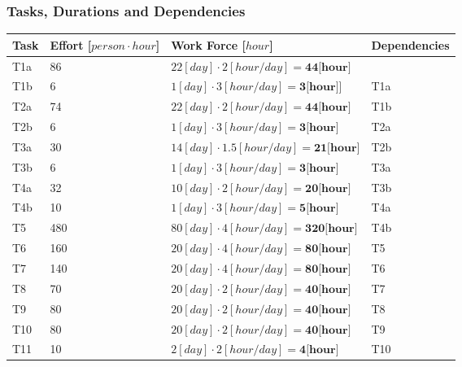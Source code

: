 \subsubsection{Tasks, Durations and Dependencies}
\lipsum[100]
\begin{center}
	\begin{tabulary}{\linewidth\tymin=70pt}{Y{1cm}|Y{2.5cm}|Y{4cm}|Y{2.5cm}}
		\textbf{Task} & \textbf{Effort [$person \cdot hour$]} & \textbf{Work Force [$hour$]} & \textbf{Dependencies} \\ \hline
		T1a &  86 & $22[day] \cdot 2[hour/day] = \textbf{44[hour]}$  & \\ \hline
		T1b & 6 & $1[day] \cdot 3[hour/day] = \textbf{3[hour]}$] & T1a \\ \hline
		T2a & 74 & $22[day] \cdot 2[hour/day] = \textbf{44[hour]}$ & T1b \\ \hline
		T2b & 6 & $1[day] \cdot 3[hour/day] = \textbf{3[hour]}$ & T2a \\ \hline
		T3a & 30 & $14[day] \cdot 1.5[hour/day] = \textbf{21[hour]}$ & T2b \\ \hline
		T3b & 6 & $1[day] \cdot 3[hour/day] = \textbf{3[hour]}$ & T3a \\ \hline
		T4a & 32 & $10[day] \cdot 2[hour/day] = \textbf{20[hour]}$ & T3b \\ \hline
		T4b & 10 & $1[day] \cdot 3[hour/day] = \textbf{5[hour]}$ & T4a \\ \hline
		T5 & 480 & $80[day] \cdot 4[hour/day] = \textbf{320[hour]}$ & T4b \\ \hline
		T6 & 160 & $20[day] \cdot 4[hour/day] = \textbf{80[hour]}$ & T5 \\ \hline
		T7 & 140 & $20[day] \cdot 4[hour/day] = \textbf{80[hour]}$ & T6 \\ \hline
		T8 & 70 & $20[day] \cdot 2[hour/day] = \textbf{40[hour]}$ & T7 \\ \hline
		T9 & 80 & $20[day] \cdot 2[hour/day] = \textbf{40[hour]}$ & T8 \\ \hline
		T10 & 80 & $20[day] \cdot 2[hour/day] = \textbf{40[hour]}$ & T9 \\ \hline
		T11 & 10 & $2[day] \cdot 2[hour/day] = \textbf{4[hour]}$ & T10 \\ \hline
	\end{tabulary}
\end{center}
%
